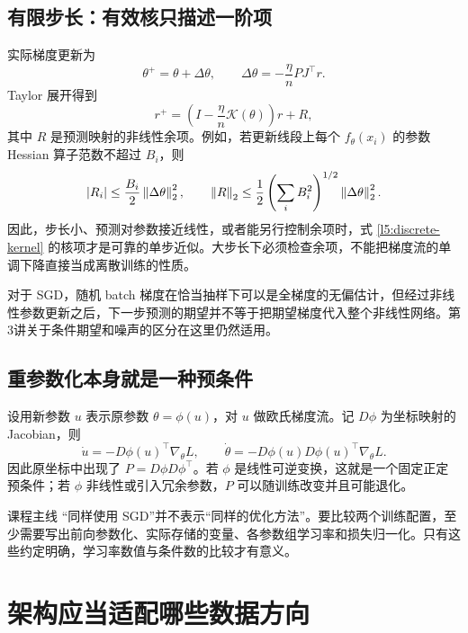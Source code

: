 \subsection{有限步长：有效核只描述一阶项}

实际梯度更新为
\begin{equation}
 \theta^+=\theta+\Delta\theta,
 \qquad \Delta\theta=-\frac\eta nP J^\top r.
\end{equation}
Taylor 展开得到
\begin{equation}
 r^+=\left(I-\frac\eta n\mathcal K(\theta)\right)r+R,
 \label{l5:discrete-kernel}
\end{equation}
其中 $R$ 是预测映射的非线性余项。例如，若更新线段上每个 $f_\theta(x_i)$ 的参数 Hessian 算子范数不超过 $B_i$，则
\begin{equation}
 |R_i|\leq\frac{B_i}{2}\left\lVert\Delta\theta\right\rVert_2^2,
 \qquad
 \left\lVert R\right\rVert_2\leq\frac12\left(\sum_iB_i^2\right)^{1/2}
 \left\lVert\Delta\theta\right\rVert_2^2.
\end{equation}
因此，步长小、预测对参数接近线性，或者能另行控制余项时，式 \eqref{l5:discrete-kernel} 的核项才是可靠的单步近似。大步长下必须检查余项，不能把梯度流的单调下降直接当成离散训练的性质。

对于 SGD，随机 batch 梯度在恰当抽样下可以是全梯度的无偏估计，但经过非线性参数更新之后，下一步预测的期望并不等于把期望梯度代入整个非线性网络。第3讲关于条件期望和噪声的区分在这里仍然适用。

\subsection{重参数化本身就是一种预条件}

设用新参数 $u$ 表示原参数 $\theta=\phi(u)$，对 $u$ 做欧氏梯度流。记 $D\phi$ 为坐标映射的 Jacobian，则
\begin{equation}
 \dot u=-D\phi(u)^\top\nabla_\theta L,
 \qquad
 \dot\theta=-D\phi(u)D\phi(u)^\top\nabla_\theta L.
 \label{l5:reparameterization}
\end{equation}
因此原坐标中出现了 $P=D\phi D\phi^\top$。若 $\phi$ 是线性可逆变换，这就是一个固定正定预条件；若 $\phi$ 非线性或引入冗余参数，$P$ 可以随训练改变并且可能退化。

\begin{coursebox}{课程主线}
“同样使用 SGD”并不表示“同样的优化方法”。要比较两个训练配置，至少需要写出前向参数化、实际存储的变量、各参数组学习率和损失归一化。只有这些约定明确，学习率数值与条件数的比较才有意义。
\end{coursebox}

\section{架构应当适配哪些数据方向}
\label{l5:target-directions}

